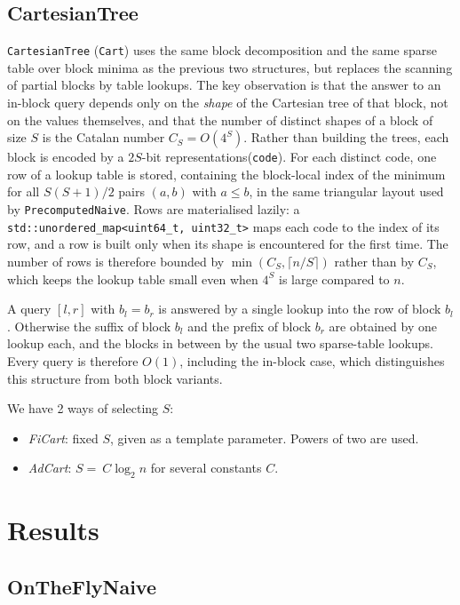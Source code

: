 \documentclass[a4paper,UKenglish,cleveref,thm-restate]{lipics-v2021}
\begin{document}
\subsection{CartesianTree}
\texttt{CartesianTree} (\texttt{Cart}) uses the same block decomposition and the same sparse table over block minima as the previous two structures,
but replaces the scanning of partial blocks by table lookups.
The key observation is that the answer to an in-block query depends only on the \emph{shape} of the Cartesian tree of that block, not on the values themselves, and that the number of distinct
shapes of a block of size $S$ is the Catalan number $C_S = O(4^S)$.
Rather than building the trees, each block is encoded by a $2S$-bit representations(\texttt{code}).
For each distinct code, one row of a lookup table is stored, containing the block-local index of the minimum for all $S(S+1)/2$ pairs $(a,b)$ with $a \le b$,
in the same triangular layout used by \texttt{PrecomputedNaive}.
Rows are materialised lazily: a \texttt{std::unordered\_map<uint64\_t, uint32\_t>} maps
each code to the index of its row, and a row is built only when its shape is
encountered for the first time. The number of rows is therefore bounded by
$\min\!\left(C_S, \lceil n/S\rceil\right)$ rather than by $C_S$, which keeps the lookup
table small even when $4^S$ is large compared to $n$.

A query $[l,r]$ with $b_l = b_r$ is answered by a single lookup into the row of block $b_l$.
Otherwise the suffix of block $b_l$ and the prefix of block $b_r$ are obtained by one lookup each, and the blocks in between by the usual two
sparse-table lookups. Every query is therefore $O(1)$, including the in-block case,
which distinguishes this structure from both block variants.

We have 2 ways of selecting $S$:
\begin{itemize}
	\item \emph{FiCart}: fixed $S$, given as a template parameter. Powers of two are used.
	\item \emph{AdCart}: $S=\ C\log_2 n$ for several constants $C$.
\end{itemize}

\section{Results}

\subsection{OnTheFlyNaive}
\end{document}
